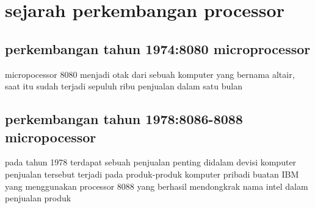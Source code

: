 \section{sejarah perkembangan processor}
	\subsection{perkembangan tahun 1974:8080 microprocessor}
	micropocessor 8080 menjadi otak dari sebuah komputer yang bernama altair, saat itu sudah terjadi sepuluh ribu penjualan dalam satu bulan
	\subsection{perkembangan tahun 1978:8086-8088 micropocessor}
	pada tahun 1978 terdapat sebuah penjualan penting didalam devisi komputer penjualan tersebut terjadi pada produk-produk komputer pribadi buatan IBM yang menggunakan processor 8088 yang berhasil mendongkrak nama intel dalam penjualan produk